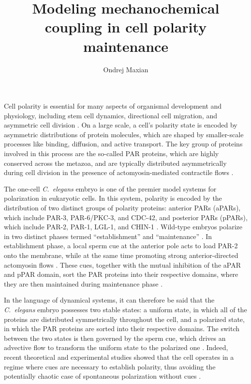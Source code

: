 \documentclass[11pt]{article}
\title{Modeling mechanochemical coupling in cell polarity maintenance  \vspace{-0.5 cm}}
\author{Ondrej Maxian  \vspace{-0.75 cm}}
\newcommand{\6}[1]{#1_{\text{6}}}
\newcommand{\3}[1]{#1_{\text{3}}}
\begin{document}
\maketitle

Cell polarity is essential for many aspects of organismal development and physiology, including stem cell dynamics, directional cell migration, and asymmetric cell division \cite{dewey2015cell, goldstein2007proteins, ierushalmi2021cytoskeletal, maitre2016asymmetric}. On a large scale, a cell's polarity state is encoded by asymmetric distributions of protein molecules, which are shaped by smaller-scale processes like binding, diffusion, and active transport. The key group of proteins involved in this process are the so-called PAR proteins, which are highly conserved across the metazoa, and are typically distributed asymmetrically during cell division \cite{kemphues1988identification, lang2017proteins} in the presence of actomyosin-mediated contractile flows \cite{munro2004cortical}. 

The one-cell \emph{C.\ elegans} embryo is one of the premier model systems for polarization in eukaryotic cells. In this system, polarity is encoded by the distribution of two distinct groups of polarity proteins: anterior PARs (aPARs), which include PAR-3, PAR-6/PKC-3, and CDC-42, and posterior PARs (pPARs), which include PAR-2, PAR-1, LGL-1, and CHIN-1 \cite{lang2017proteins}. Wild-type embryos polarize in two distinct phases termed ``establishment'' and ``maintenance'' \cite{cuenca2003polarization}. In establishment phase, a local sperm cue at the anterior pole acts to load PAR-2 onto the membrane, while at the same time promoting strong anterior-directed actomyosin flows \cite{gan2021mechanochemical}. These cues, together with the mutual inhibition of the aPAR and pPAR domain, sort the PAR proteins into their respective domains, where they are then maintained during maintenance phase \cite{munro2004cortical, schonegg2006cdc}. 

In the language of dynamical systems, it can therefore be said that the \emph{C.\ elegans} embryo possesses two stable states: a uniform state, in which all of the proteins are distributed symmetrically throughout the cell, and a polarized state, in which the PAR proteins are sorted into their respective domains. The switch between the two states is then governed by the sperm cue, which drives an advective flow to transform the uniform state to the polarized one \cite{goehring2011polarization, gross2019guiding}. Indeed, recent theoretical and experimental studies showed that the cell operates in a regime where cues are necessary to establish polarity, thus avoiding the potentially chaotic case of spontaneous polarization without cues \cite{gross2019guiding}.
\end{document}
